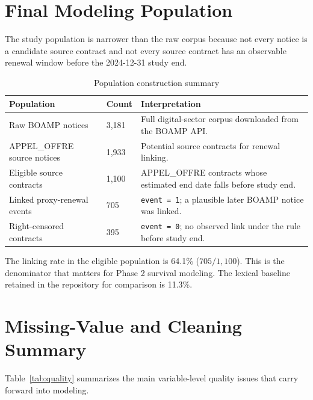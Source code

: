 \documentclass[11pt,a4paper]{article}
\begin{document}
\section{Final Modeling Population}

The study population is narrower than the raw corpus because not every notice is
a candidate source contract and not every source contract has an observable
renewal window before the 2024-12-31 study end.

\begin{table}[H]
\centering
\caption{Population construction summary}
\small
\begin{tabularx}{\linewidth}{L{4.2cm}L{1.6cm}Y}
\toprule
Population & Count & Interpretation \\
\midrule
Raw BOAMP notices & 3{,}181 & Full digital-sector corpus downloaded from the BOAMP API. \\
APPEL\_OFFRE source notices & 1{,}933 & Potential source contracts for renewal linking. \\
Eligible source contracts & 1{,}100 & APPEL\_OFFRE contracts whose estimated end date falls before study end. \\
Linked proxy-renewal events & 705 & \texttt{event = 1}; a plausible later BOAMP notice was linked. \\
Right-censored contracts & 395 & \texttt{event = 0}; no observed link under the rule before study end. \\
\bottomrule
\end{tabularx}
\end{table}

The linking rate in the eligible population is 64.1\% ($705 / 1{,}100$). This
is the denominator that matters for Phase 2 survival modeling. The lexical
baseline retained in the repository for comparison is 11.3\%.

\section{Missing-Value and Cleaning Summary}

Table~\ref{tab:quality} summarizes the main variable-level quality issues that
carry forward into modeling.
\end{document}
